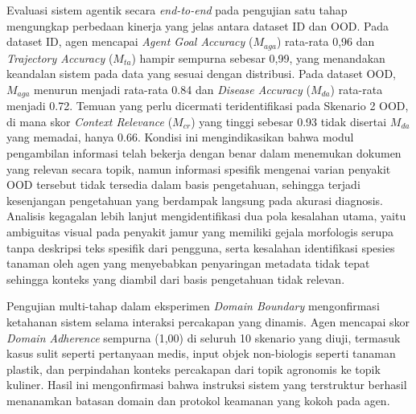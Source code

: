 Evaluasi sistem agentik secara \textit{end-to-end} pada pengujian satu tahap mengungkap perbedaan kinerja yang jelas antara dataset ID dan OOD. Pada dataset ID, agen mencapai \textit{Agent Goal Accuracy} ($M_{aga}$) rata-rata 0,96 dan \textit{Trajectory Accuracy} ($M_{ta}$) hampir sempurna sebesar 0,99, yang menandakan keandalan sistem pada data yang sesuai dengan distribusi. Pada dataset OOD, $M_{aga}$ menurun menjadi rata-rata 0.84 dan \textit{Disease Accuracy} ($M_{da}$) rata-rata menjadi 0.72. Temuan yang perlu dicermati teridentifikasi pada Skenario 2 OOD, di mana skor \textit{Context Relevance} ($M_{cr}$) yang tinggi sebesar 0.93 tidak disertai $M_{da}$ yang memadai, hanya 0.66. Kondisi ini mengindikasikan bahwa modul pengambilan informasi telah bekerja dengan benar dalam menemukan dokumen yang relevan secara topik, namun informasi spesifik mengenai varian penyakit OOD tersebut tidak tersedia dalam basis pengetahuan, sehingga terjadi kesenjangan pengetahuan yang berdampak langsung pada akurasi diagnosis. Analisis kegagalan lebih lanjut mengidentifikasi dua pola kesalahan utama, yaitu ambiguitas visual pada penyakit jamur yang memiliki gejala morfologis serupa tanpa deskripsi teks spesifik dari pengguna, serta kesalahan identifikasi spesies tanaman oleh agen yang menyebabkan penyaringan metadata tidak tepat sehingga konteks yang diambil dari basis pengetahuan tidak relevan.

Pengujian multi-tahap dalam eksperimen \textit{Domain Boundary} mengonfirmasi ketahanan sistem selama interaksi percakapan yang dinamis. Agen mencapai skor \textit{Domain Adherence} sempurna (1,00) di seluruh 10 skenario yang diuji, termasuk kasus sulit seperti pertanyaan medis, input objek non-biologis seperti tanaman plastik, dan perpindahan konteks percakapan dari topik agronomis ke topik kuliner. Hasil ini mengonfirmasi bahwa instruksi sistem yang terstruktur berhasil menanamkan batasan domain dan protokol keamanan yang kokoh pada agen.


